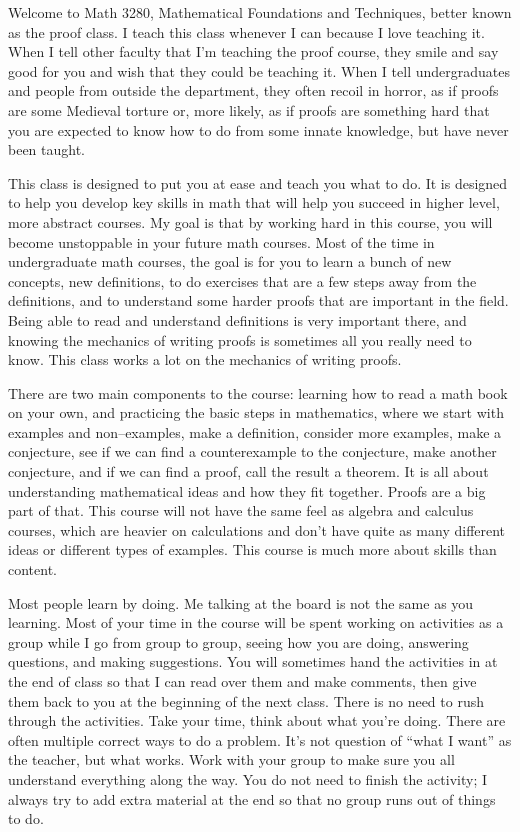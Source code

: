 
Welcome to Math 3280, Mathematical Foundations and Techniques, better known as the proof class.
I teach this class whenever I can because I love teaching it.
When I tell other faculty that I'm teaching the proof course, they smile and say good for you and wish that they could be teaching it.
When I tell undergraduates and people from outside the department, they often recoil in horror, as if proofs are some Medieval torture or, more likely, as if proofs are something hard that you are expected to know how to do from some innate knowledge, but have never been taught.
\vskip 0.1in

This class is designed to put you at ease and teach you what to do.
It is designed to help you develop key skills in math that will help you succeed in higher level, more abstract courses.
My goal is that by working hard in this course, you will become unstoppable in your future math courses.
Most of the time in undergraduate math courses, the goal is for you to learn a bunch of new concepts, new definitions, to do exercises that are a few steps away from the definitions, and to understand some harder proofs that are important in the field.
Being able to read and understand definitions is very important there, and knowing the mechanics of writing proofs is sometimes all you really need to know.
This class works a lot on the mechanics of writing proofs.
\vskip 0.1in

There are two main components to the course:  learning how to read a math book on your own, and practicing the basic steps in mathematics, where we start with examples and non--examples, make a definition, consider more examples, make a conjecture, see if we can find a counterexample to the conjecture, make another conjecture, and if we can find a proof, call the result a theorem.
It is all about understanding mathematical ideas and how they fit together.
Proofs are a big part of that.
This course will not have the same feel as algebra and calculus courses, which are heavier on calculations and don't have quite as many different ideas or different types of examples.
This course is much more about skills than content.
\vskip 0.1in

Most people learn by doing.
Me talking at the board is not the same as you learning.
Most of your time in the course will be spent working on activities as a group while I go from group to group, seeing how you are doing, answering questions, and making suggestions.
You will sometimes hand the activities in at the end of class so that I can read over them and make comments, then give them back to you at the beginning of the next class.
There is no need to rush through the activities.
Take your time, think about what you're doing.
There are often multiple correct ways to do a problem.
It's not question of ``what I want'' as the teacher, but what works.
Work with your group to make sure you all understand everything along the way.
You do not need to finish the activity; I always try to add extra material at the end so that no group runs out of things to do.
\vskip 0.1in

